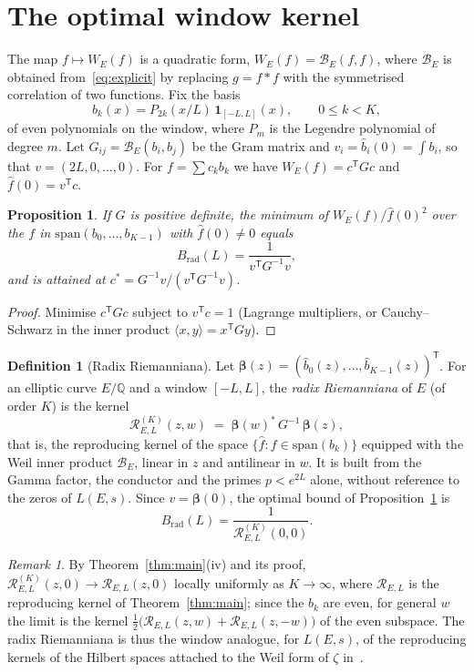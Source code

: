 \documentclass[11pt]{amsart}
\newtheorem{proposition}[theorem]{Proposition}
\theoremstyle{remark}
\newtheorem{remark}[theorem]{Remark}
\theoremstyle{definition}
\newtheorem{definition}[theorem]{Definition}
\newcommand{\Q}{\mathbb{Q}}
\begin{document}
\section{The optimal window kernel}

The map $f\mapsto W_E(f)$ is a quadratic form, $W_E(f)=\mathcal B_E(f,f)$, where $\mathcal B_E$ is obtained from~\eqref{eq:explicit} by replacing $g=f*f$ with the symmetrised correlation of two functions. Fix the basis
\[
b_k(x)=P_{2k}(x/L)\,\mathbf 1_{[-L,L]}(x),\qquad 0\le k<K,
\]
of even polynomials on the window, where $P_m$ is the Legendre polynomial of degree $m$. Let $G_{ij}=\mathcal B_E(b_i,b_j)$ be the Gram matrix and $v_i=\hat b_i(0)=\int b_i$, so that $v=(2L,0,\dots,0)$. For $f=\sum c_k b_k$ we have $W_E(f)=c^{\mathsf T}Gc$ and $\hat f(0)=v^{\mathsf T}c$.

\begin{proposition}\label{prop:opt}
If $G$ is positive definite, the minimum of $W_E(f)/\hat f(0)^2$ over the $f$ in $\mathrm{span}(b_0,\dots,b_{K-1})$ with $\hat f(0)\ne0$ equals
\[
B_{\mathrm{rad}}(L)=\frac{1}{v^{\mathsf T}G^{-1}v},
\]
and is attained at $c^\ast=G^{-1}v/(v^{\mathsf T}G^{-1}v)$.
\end{proposition}
\begin{proof}
Minimise $c^{\mathsf T}Gc$ subject to $v^{\mathsf T}c=1$ (Lagrange multipliers, or Cauchy--Schwarz in the inner product $\langle x,y\rangle=x^{\mathsf T}Gy$).
\end{proof}

\begin{definition}[Radix Riemanniana]\label{def:radix}
Let $\boldsymbol\beta(z)=(\hat b_0(z),\dots,\hat b_{K-1}(z))^{\mathsf T}$. For an elliptic curve $E/\Q$ and a window $[-L,L]$, the \emph{radix Riemanniana} of $E$ (of order $K$) is the kernel
\[
\mathcal R^{(K)}_{E,L}(z,w)\;=\;\boldsymbol\beta(w)^{\ast}\,G^{-1}\,\boldsymbol\beta(z),
\]
that is, the reproducing kernel of the space $\{\hat f: f\in\mathrm{span}(b_k)\}$ equipped with the Weil inner product $\mathcal B_E$, linear in $z$ and antilinear in $w$. It is built from the Gamma factor, the conductor and the primes $p<e^{2L}$ alone, without reference to the zeros of $L(E,s)$. Since $v=\boldsymbol\beta(0)$, the optimal bound of Proposition~\ref{prop:opt} is
\[
B_{\mathrm{rad}}(L)=\frac{1}{\mathcal R^{(K)}_{E,L}(0,0)}.
\]
\end{definition}

\begin{remark}
By Theorem~\ref{thm:main}(iv) and its proof, $\mathcal R^{(K)}_{E,L}(z,0)\to\mathcal R_{E,L}(z,0)$ locally uniformly as $K\to\infty$, where $\mathcal R_{E,L}$ is the reproducing kernel of Theorem~\ref{thm:main}; since the $b_k$ are even, for general $w$ the limit is the kernel $\tfrac12\bigl(\mathcal R_{E,L}(z,w)+\mathcal R_{E,L}(z,-w)\bigr)$ of the even subspace. The radix Riemanniana is thus the window analogue, for $L(E,s)$, of the reproducing kernels of the Hilbert spaces attached to the Weil form of $\zeta$ in~\cite{SuzukiCJM,Suzuki}.
\end{remark}
\end{document}
